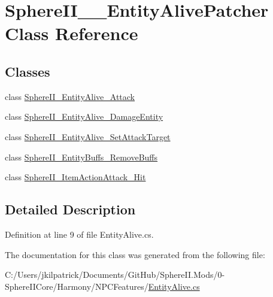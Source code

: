 \hypertarget{class_sphere_i_i_____entity_alive_patcher}{}\section{Sphere\+I\+I\+\_\+\+\_\+\+Entity\+Alive\+Patcher Class Reference}
\label{class_sphere_i_i_____entity_alive_patcher}
\subsection*{Classes}
\begin{DoxyCompactItemize}
\item 
class \mbox{\hyperlink{class_sphere_i_i_____entity_alive_patcher_1_1_sphere_i_i___entity_alive___attack}{Sphere\+I\+I\+\_\+\+Entity\+Alive\+\_\+\+Attack}}
\item 
class \mbox{\hyperlink{class_sphere_i_i_____entity_alive_patcher_1_1_sphere_i_i___entity_alive___damage_entity}{Sphere\+I\+I\+\_\+\+Entity\+Alive\+\_\+\+Damage\+Entity}}
\item 
class \mbox{\hyperlink{class_sphere_i_i_____entity_alive_patcher_1_1_sphere_i_i___entity_alive___set_attack_target}{Sphere\+I\+I\+\_\+\+Entity\+Alive\+\_\+\+Set\+Attack\+Target}}
\item 
class \mbox{\hyperlink{class_sphere_i_i_____entity_alive_patcher_1_1_sphere_i_i___entity_buffs___remove_buffs}{Sphere\+I\+I\+\_\+\+Entity\+Buffs\+\_\+\+Remove\+Buffs}}
\item 
class \mbox{\hyperlink{class_sphere_i_i_____entity_alive_patcher_1_1_sphere_i_i___item_action_attack___hit}{Sphere\+I\+I\+\_\+\+Item\+Action\+Attack\+\_\+\+Hit}}
\end{DoxyCompactItemize}


\subsection{Detailed Description}


Definition at line 9 of file Entity\+Alive.\+cs.



The documentation for this class was generated from the following file\+:\begin{DoxyCompactItemize}
\item 
C\+:/\+Users/jkilpatrick/\+Documents/\+Git\+Hub/\+Sphere\+I\+I.\+Mods/0-\/\+Sphere\+I\+I\+Core/\+Harmony/\+N\+P\+C\+Features/\mbox{\hyperlink{_entity_alive_8cs}{Entity\+Alive.\+cs}}\end{DoxyCompactItemize}

